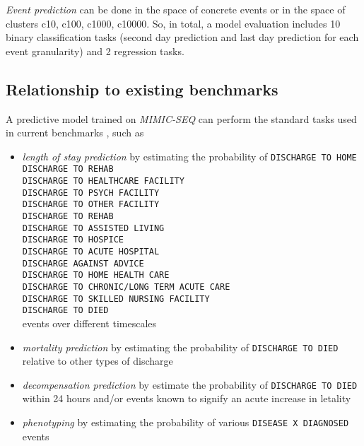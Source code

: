 \emph{Event prediction} can be done in the space of concrete events or in the space of clusters c10, c100, c1000, c10000.
So, in total, a model evaluation includes 10 binary classification tasks (second day prediction and last day prediction for each event granularity) and 2 regression tasks.

\subsection{Relationship to existing benchmarks}

A predictive model trained on \emph{MIMIC-SEQ} can perform the standard tasks used in current benchmarks \cite{harutyunyanMultitaskLearningBenchmarking2019}, such as
\begin{itemize}
    \item \emph{length of stay prediction} by estimating the probability of \texttt{DISCHARGE TO HOME} \\ \texttt{DISCHARGE TO REHAB} \\ \texttt{DISCHARGE TO HEALTHCARE FACILITY} \\ \texttt{DISCHARGE TO PSYCH FACILITY}\\\texttt{DISCHARGE TO OTHER FACILITY}\\\texttt{DISCHARGE TO REHAB}\\\texttt{DISCHARGE TO ASSISTED LIVING}\\\texttt{DISCHARGE TO HOSPICE}\\\texttt{DISCHARGE TO ACUTE HOSPITAL}\\\texttt{DISCHARGE AGAINST ADVICE} \\ \texttt{DISCHARGE TO HOME HEALTH CARE} \\ \texttt{DISCHARGE TO CHRONIC/LONG TERM ACUTE CARE} \\ \texttt{DISCHARGE TO SKILLED NURSING FACILITY} \\ \texttt{DISCHARGE TO DIED} \\ events over different timescales
    \item \emph{mortality prediction} by estimating the probability of \texttt{DISCHARGE TO DIED} relative to other types of discharge
    \item \emph{decompensation prediction} by estimate the probability of \texttt{DISCHARGE TO DIED} within 24 hours and/or events known to signify an acute increase in letality
    \item \emph{phenotyping} by estimating the probability of various \texttt{DISEASE X DIAGNOSED} events
\end{itemize}

